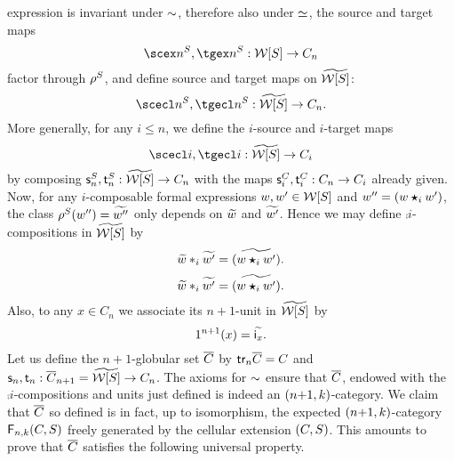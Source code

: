   expression is invariant under $\sim$, therefore also under $\simeq$, 
 the source and target maps
  \[\scex n^S,\tgex n^S:\wtx S\to C_n\]
  factor through $\rho^{S}$, and define source and target maps on $\widetilde{\mathcal{W}[S]}$:
  \[\scecl n^S,\tgecl n^S:\wtxeq S\to C_n.\]
  More generally, for any $i\leq n$, we define the $i$-source and
  $i$-target maps
  \[\scecl i,\tgecl i:\wtxeq S\to C_i\]
  by composing $\mathsf{s}_{n}^S,\mathsf{t}_{n}^S:\widetilde{\mathcal{W}[S]}\to C_n$ with the maps $\mathsf{s}_{i}^C,\mathsf{t}_{i}^C:C_n\to C_i$ already given. Now, for any $i$-composable formal expressions
  $w,w'\in \mathcal{W}[S]$ and $w''=(w\bm{\star}_{i} w')$, the class $\rho^{S}(w'')=\widetilde{w''}$ only
  depends on $\widetilde{w}$ and $\widetilde{w'}$. Hence we may define 
 $\comp i$-compositions in $\widetilde{\mathcal{W}[S]}$ by
 \[\widetilde{w}\ast_{i}\widetilde{w'}=\widetilde{(w\bm{\star}_{i} w')}.\]
 \[\widetilde{w}\ast_{i}\widetilde{w'}=\widetilde{(w\bm{\star}_{i} w')}.\]
 Also, to any $x\in C_n$ we associate its $n{+}1$-unit in $\widetilde{\mathcal{W}[S]}$ by
  \[1^{n+1}(x)=\widetilde{\mathsf{i}_{x}}.\]
  Let us define the $n{+}1$-globular set $\overline{C}$ by
  $\mathsf{tr}_{n}\overline{C}=C$ and $\mathsf{s}_{n},\mathsf{t}_{n}:\overline{C}_{n+1}=\widetilde{\mathcal{W}[S]}\to C_n$.
  The axioms for $\sim$ ensure that $\overline{C}$, endowed with
  the $\comp i$-compositions and units just defined is indeed an
  $(n{+}1,k)$-category. We claim that $\overline{C}$ so defined is
  in fact, up to isomorphism, the expected $(n{+}1,k)$-category
  $\mathsf{F}_{n,k}(C,S)$ freely generated by the cellular extension $(C,S)$.
  This amounts to prove that $\overline{C}$ satisfies the following universal property.
  
